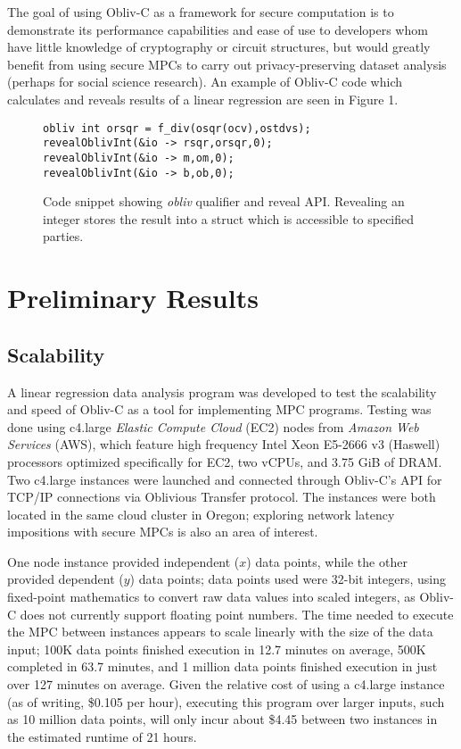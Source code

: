 \documentclass[conference]{IEEEtran}
\begin{document}
The goal of using Obliv-C as a framework for secure computation is to demonstrate 
its performance capabilities and ease of use to developers whom have little 
knowledge of cryptography or circuit structures, but would greatly benefit from 
using secure MPCs to carry out privacy-preserving dataset analysis (perhaps for
social science research). An example of Obliv-C code which calculates and 
reveals results of a linear regression are seen in Figure 1.
\begin{figure}[!t]
\centering
\begin{verbatim}
obliv int orsqr = f_div(osqr(ocv),ostdvs);
revealOblivInt(&io -> rsqr,orsqr,0);
revealOblivInt(&io -> m,om,0);
revealOblivInt(&io -> b,ob,0);
\end{verbatim}
\caption{Code snippet showing \emph{obliv} qualifier and reveal API. Revealing an integer
stores the result into a struct which is accessible to specified parties.}
\label{snippet}
\end{figure}

\section{Preliminary Results}
\subsection{Scalability}
A linear regression data analysis program was developed to test the scalability 
and speed of Obliv-C as a tool for implementing MPC programs. 
Testing was done using c4.large \emph{Elastic Compute Cloud} (EC2) nodes from \emph{Amazon Web Services} (AWS)\cite{aws:ec2}, which feature 
high frequency Intel Xeon E5-2666 v3 (Haswell) processors optimized specifically for EC2,
two vCPUs, and 3.75 GiB of DRAM.
Two c4.large instances were launched and connected through 
Obliv-C's API for TCP/IP connections via Oblivious Transfer protocol. The instances 
were both located in the same cloud cluster in Oregon; exploring network latency 
impositions with secure MPCs is also an area of interest.

One node instance provided independent ($x$) data points, while the other provided 
dependent ($y$) data points; data points used were 32-bit integers, using fixed-point 
mathematics to convert raw data values into scaled integers, as 
Obliv-C does not currently support floating point numbers.
The time needed to execute the MPC between instances appears to scale linearly 
with the size of the data input; 100K data points finished execution in 12.7 minutes 
on average, 500K completed in 63.7 minutes, and 1 million data points finished execution 
in just over 127 minutes on average. Given the relative cost of using a c4.large instance
(as of writing, \$0.105 per hour), executing this program over larger inputs, such as
10 million data points, will only incur about \$4.45 between two instances in the 
estimated runtime of 21 hours.
\end{document}
